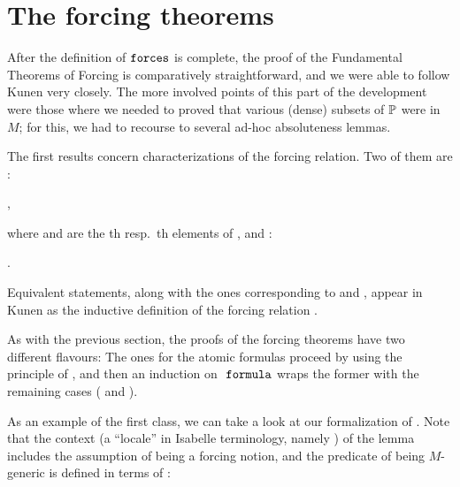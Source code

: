 \section{The forcing theorems}
\label{sec:forcing-theorems}

After the definition of $\mathop{\mathtt{forces}}$ is complete, the proof of the
Fundamental Theorems of Forcing is comparatively straightforward, and
we were able to follow Kunen very closely. The more involved points of
this part of the development were those where we needed to proved that
various (dense) subsets of $\mathbb{P}$ were in $M$; for this, we had to
recourse to several ad-hoc absoluteness lemmas.

The first results concern characterizations of the forcing
relation. Two of them are :
\begin{center}
  ,
\end{center}
where  and  are the
th resp.\ th elements of , and  :
\begin{center}
  .
\end{center}
Equivalent statements, along with the ones corresponding to  and
, appear in Kunen as the
inductive definition of the forcing relation \cite[Def.~IV.2.42]{kunen2011set}.

As with the previous section, the proofs of the forcing theorems have two different
flavours: The ones for the atomic formulas proceed by using the
principle of 
, and then an induction on
$\formula$ wraps the former with the remaining cases ( and ). 

As an example of the first class, we can take a look at our
formalization of \cite[Lem.~IV.2.40(a)]{kunen2011set}. Note that the
context (a ``locale'' in Isabelle terminology, namely ) of the lemma 
includes the assumption of  being
a forcing notion, and the predicate of being $M$-generic is defined in
terms of :

